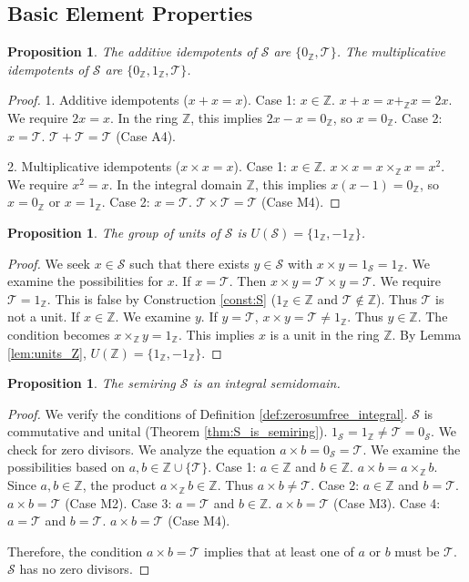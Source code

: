 \documentclass[11pt, a4paper]{article}
\theoremstyle{plain}
\newtheorem{proposition}[theorem]{Proposition}
\theoremstyle{definition}
\numberwithin{equation}{section}
\newcommand{\Z}{\mathbb{Z}}
\newcommand{\Tobj}{\mathcal{T}} %
\newcommand{\SemiringS}{\mathcal{S}}
\begin{document}
\subsection{Basic Element Properties}

\begin{proposition}\label{prop:idempotents}
The additive idempotents of $\SemiringS$ are $\{0_{\Z}, \Tobj\}$. The multiplicative idempotents of $\SemiringS$ are $\{0_{\Z}, 1_{\Z}, \Tobj\}$.
\end{proposition}
\begin{proof}
1. Additive idempotents ($x+x=x$).
Case 1: $x \in \Z$. $x+x = x+_{\Z} x = 2x$. We require $2x=x$. In the ring $\Z$, this implies $2x-x=0_{\Z}$, so $x=0_{\Z}$.
Case 2: $x=\Tobj$. $\Tobj+\Tobj=\Tobj$ (Case A4).

2. Multiplicative idempotents ($x\times x=x$).
Case 1: $x \in \Z$. $x\times x = x\times_{\Z} x = x^2$. We require $x^2=x$. In the integral domain $\Z$, this implies $x(x-1)=0_{\Z}$, so $x=0_{\Z}$ or $x=1_{\Z}$.
Case 2: $x=\Tobj$. $\Tobj\times\Tobj=\Tobj$ (Case M4).
\end{proof}

\begin{proposition}\label{prop:units_S}
The group of units of $\SemiringS$ is $U(\SemiringS) = \{1_{\Z}, -1_{\Z}\}$.
\end{proposition}
\begin{proof}
We seek $x \in \SemiringS$ such that there exists $y \in \SemiringS$ with $x\times y = 1_{\SemiringS} = 1_{\Z}$.
We examine the possibilities for $x$.
If $x=\Tobj$. Then $x\times y = \Tobj\times y = \Tobj$. We require $\Tobj=1_{\Z}$. This is false by Construction \ref{const:S} ($1_{\Z} \in \Z$ and $\Tobj \notin \Z$). Thus $\Tobj$ is not a unit.
If $x \in \Z$. We examine $y$. If $y=\Tobj$, $x\times y = \Tobj \neq 1_{\Z}$. Thus $y \in \Z$.
The condition becomes $x\times_{\Z} y = 1_{\Z}$. This implies $x$ is a unit in the ring $\Z$. By Lemma \ref{lem:units_Z}, $U(\Z)=\{1_{\Z}, -1_{\Z}\}$.
\end{proof}

\begin{proposition}\label{prop:integral_semidomain}
The semiring $\SemiringS$ is an integral semidomain.
\end{proposition}
\begin{proof}
We verify the conditions of Definition \ref{def:zerosumfree_integral}. $\SemiringS$ is commutative and unital (Theorem \ref{thm:S_is_semiring}). $1_{\SemiringS}=1_{\Z} \neq \Tobj=0_{\SemiringS}$.
We check for zero divisors. We analyze the equation $a\times b = 0_{\SemiringS} = \Tobj$.
We examine the possibilities based on $a, b \in \Z \cup \{\Tobj\}$.
Case 1: $a \in \Z$ and $b \in \Z$. $a\times b = a\times_{\Z} b$. Since $a, b \in \Z$, the product $a\times_{\Z} b \in \Z$. Thus $a\times b \neq \Tobj$.
Case 2: $a \in \Z$ and $b = \Tobj$. $a\times b = \Tobj$ (Case M2).
Case 3: $a = \Tobj$ and $b \in \Z$. $a\times b = \Tobj$ (Case M3).
Case 4: $a = \Tobj$ and $b = \Tobj$. $a\times b = \Tobj$ (Case M4).

Therefore, the condition $a\times b = \Tobj$ implies that at least one of $a$ or $b$ must be $\Tobj$. $\SemiringS$ has no zero divisors.
\end{proof}
\end{document}
